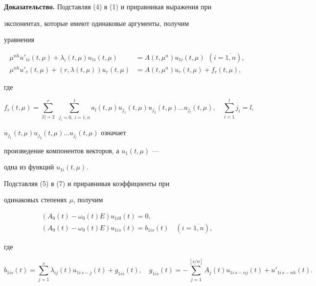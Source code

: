 {\bf Доказательство.} Подставляя (4) в (1) и приравнивая выражения при


экспонентах, которые имеют одинаковые аргументы, получим


уравнения


\begin{align}


\mu^{nh}u'_{1i}(t,\mu)+\lambda_{i}(t,\mu)u_{1i}(t,\mu)&=A(t,\mu^{n})


u_{1i}(t,\mu) \ \ (i=\overline{1,n}),\\


%


\mu^{nh} u'_{r}


(t,\mu)+(r,\lambda(t,\mu)) u_{r} (t,\mu)&=A(t,\mu^{n})u_{r}


(t,\mu)+f_{r} (t,\mu),


\end{align}


где


$$


f_{r}(t,\mu)=\sum_{|l|=2}^{r}\;\sum_{j_{i}=0,\; i=\overline{1,n}}^{l}


a_{l}(t,\mu)u_{j_{1}} (t,\mu)u_{j_{2}} (t,\mu)\dotsc u_{j_{l}}


(t,\mu),\quad \sum_{i=1}^{l}j_{i}=l,


$$


$u_{j_{1}}(t,\mu)u_{j_{2}} (t,\mu)\dotsc u_{j_{l}} (t,\mu)$ означает


произведение компонентов векторов, а $u_{1} (t,\mu)$ ---


одна из функций $u_{1i}(t,\mu)$.





Подставляя (5) в (7) и приравнивая коэффициенты при


одинаковых степенях $\mu$, получим


\begin{gather}


(A_{0}(t)-\omega_{0}(t)E)u_{1i0}(t)=0,\\


%


(A_{0}(t)-\omega_{0}(t)E)u_{1is}(t)=b_{1is}(t)\quad (i=\overline{1,n}),


\end{gather}


где


\begin{equation}


b_{1is}(t)=\sum_{j=1}^{s}\lambda_{ij}(t)u_{1i\,s-j}(t)+g_{1is}(t),\quad


g_{1is}(t)=-\sum_{j=1}^{[s/n]}A_{j}(t)u_{1i\,s-nj}(t)+


u'_{1i\,s-nh}(t).


\end{equation}


